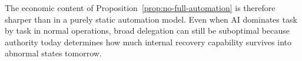 The economic content of Proposition~\ref{prop:no-full-automation} is therefore sharper than in a purely static automation model. Even when AI dominates task by task in normal operations, broad delegation can still be suboptimal because authority today determines how much internal recovery capability survives into abnormal states tomorrow.
